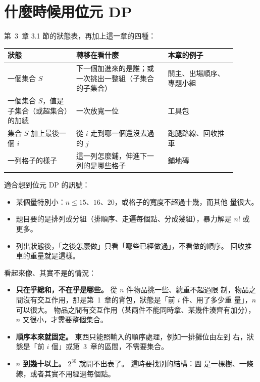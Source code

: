 \section{什麼時候用位元 DP}
\label{sec:bm-when}

第~3~章 3.1 節的狀態表，再加上這一章的四種：

\begin{center}
\begin{tabular}{p{0.27\linewidth}p{0.36\linewidth}p{0.27\linewidth}}
\toprule
狀態 & 轉移在看什麼 & 本章的例子 \\
\midrule
一個集合 $S$ & 下一個加進來的是誰；或一次挑出一整組（子集合的子集合） & 關主、出場順序、專題小組 \\
一個集合 $S$，值是子集合（或超集合）的加總 & 一次放寬一位 & 工具包 \\
集合 $S$ 加上最後一個 $i$ & 從 $i$ 走到哪一個還沒去過的 $j$ & 跑腿路線、回收推車 \\
一列格子的樣子 & 這一列怎麼鋪，伸進下一列的是哪些格子 & 鋪地磚 \\
\bottomrule
\end{tabular}
\end{center}

適合想到位元 DP 的訊號：

\begin{itemize}
\item 某個量特別小：$n \le 15$、$16$、$20$，或格子的寬度不超過十幾，而其他
量很大。
\item 題目要的是排列或分組（排順序、走遍每個點、分成幾組），暴力解是 $n!$ 或
更多。
\item 列出狀態後，「之後怎麼做」只看「哪些已經做過」，不看做的順序。 回收推
車的重量就是這樣。
\end{itemize}

看起來像、其實不是的情況：

\begin{itemize}
\item \textbf{只在乎總和，不在乎是哪些。} 從 $n$ 件物品挑一些、總重不超過限
制，物品之間沒有交互作用，那是第~1~章的背包，狀態是「前 $i$ 件、用了多少重
量」，$n$ 可以很大。 物品之間有交互作用（某兩件不能同時拿、某幾件湊齊有加分），
$n$ 又很小，才需要整個集合。
\item \textbf{順序本來就固定。} 東西只能照輸入的順序處理，例如一排攤位由左到
右，狀態是「前 $i$ 個」或第~3~章的區間，不需要集合。
\item \textbf{$n$ 到幾十以上。} $2^{30}$ 就開不出表了。 這時要找別的結構：圖
是一棵樹、一條線，或者其實不用經過每個點。
\end{itemize}

